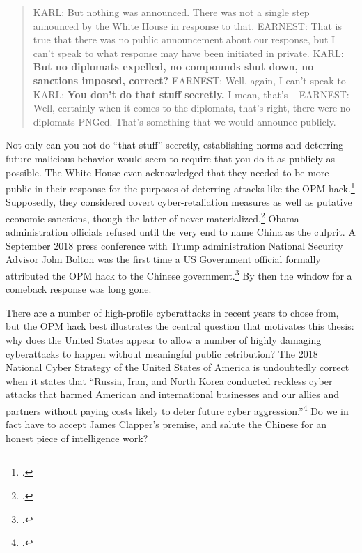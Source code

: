 \documentclass{report}
\begin{document}
\begin{refsegment}
\begin{quote}
KARL: But nothing was announced. There was not a single step announced by the White House in response to that.
\newline \newline
EARNEST: That is true that there was no public announcement about our response, but I can't speak to what response may have been initiated in private.
\newline \newline
KARL: \textbf{But no diplomats expelled, no compounds shut down, no sanctions imposed, correct?}
\newline \newline
EARNEST: Well, again, I can't speak to --
\newline \newline
KARL: \textbf{You don't do that stuff secretly.}  I mean, that's --
\newline \newline
EARNEST: Well, certainly when it comes to the diplomats, that's right, there were no diplomats PNGed. That's something that we would announce publicly.
\end{quote}

Not only can you not do ``that stuff'' secretly, establishing norms and deterring future malicious behavior would seem to require that you do it as publicly as possible. The White House even acknowledged that they needed to be more public in their response for the purposes of deterring attacks like the OPM hack.\footcite{sanger_u.s._2016} Supposedly, they considered covert cyber-retaliation measures as well as putative economic sanctions, though the latter of never materialized.\footcite{nakashima_hacks_2015} Obama administration officials refused until the very end to name China as the culprit. A September 2018 press conference with Trump administration National Security Advisor John Bolton was the first time a US Government official formally attributed the OPM hack to the Chinese government.\footcite{sanger_trump_2018} By then the window for a comeback response was long gone.

There are a number of high-profile cyberattacks in recent years to chose from, but the OPM hack best illustrates the central question that motivates this thesis: why does the United States appear to allow a number of highly damaging cyberattacks to happen without meaningful public retribution? The 2018 National Cyber Strategy of the United States of America is undoubtedly correct when it states that ``Russia, Iran, and North Korea conducted reckless cyber attacks that harmed American and international businesses and our allies and partners without paying costs likely to deter future cyber aggression.''\footcite{trump_national_2018} Do we in fact have to accept James Clapper's premise, and salute the Chinese for an honest piece of intelligence work?


\end{refsegment}
\end{document}
